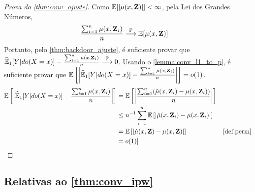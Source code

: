 \begin{proof}[Prova do \cref{thm:conv_ajuste}]
 Como ${\mathbb E}[|\mu(x,{\mathbf{Z}})|] < \infty$,
 pela Lei dos Grandes Números,
 \begin{align*}
  \frac{\sum_{i=1}^n \mu(x,{\mathbf{Z}}_i)}{n}
  &\stackrel{{\mathbb P}}{\longrightarrow} {\mathbb E}[\mu(x,{\mathbf{Z}})]
 \end{align*}
 Portanto, pelo \cref{thm:backdoor_ajuste},
 é suficiente provar que
 ${\widehat{{\mathbb E}}}_{1}[Y|do(X=x)] - \frac{\sum_{i=1}^n \mu(x,{\mathbf{Z}}_i)}{n} \stackrel{{\mathbb P}}{\longrightarrow} 0$.
 Usando o \cref{lemma:conv_l1_to_p}, é suficiente provar que 
 ${\mathbb E}\left[\bigg|{\widehat{{\mathbb E}}}_{1}[Y|do(X=x)] - \frac{\sum_{i=1}^n \mu(x,{\mathbf{Z}}_i)}{n}\bigg|\right] 
 = o(1)$.
 \begin{align*}
  \E\left[\bigg|\hdoy - \frac{\sum_{i=1}^n \mu(x,\Z_i)}{n}\bigg|\right]
  &= \E\left[\bigg|\frac{\sum_{i=1}^n 
  (\hat{\mu}(x,\Z_i)-\mu(x,\Z_i))}{n}\bigg|\right] \\
  &\leq n^{-1}\sum_{i=1}^n \E\left[| 
  \hat{\mu}(x,\Z_i)-\mu(x,\Z_i)|\right] \\
  &= \E\left[|\hat{\mu}(x,\Z)-\mu(x,\Z)|\right] 
  & \text{\cref{def:perm}} \\
  &= o(1)]
 \end{align*}
\end{proof}

\subsection{Relativas ao \cref{thm:conv_ipw}}

